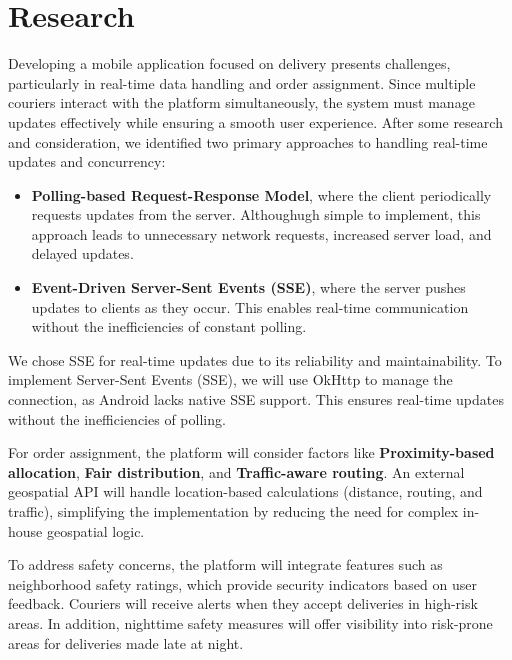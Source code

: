 \documentclass[a4paper,twoside,11pt]{article}
\begin{document}
\section*{Research}

Developing a mobile application focused on delivery presents challenges, particularly in real-time data handling and order assignment. Since multiple couriers interact with the platform simultaneously, the system must manage updates effectively while ensuring a smooth user experience. After some research and consideration, we identified two primary approaches to handling real-time updates and concurrency:

\begin{itemize}
    \item \textbf{Polling-based Request-Response Model}, where the client periodically requests updates from the server. Althoughugh simple to implement, this approach leads to unnecessary network requests, increased server load, and delayed updates.
    \item \textbf{Event-Driven Server-Sent Events (SSE)}, where the server pushes updates to clients as they occur. This enables real-time communication without the inefficiencies of constant polling.
\end{itemize}

We chose SSE for real-time updates due to its reliability and maintainability. To implement Server-Sent Events (SSE), we will use OkHttp to manage the connection, as Android lacks native SSE support. This ensures real-time updates without the inefficiencies of polling.

\vspace{2mm}

For order assignment, the platform will consider factors like \textbf{Proximity-based allocation}, \textbf{Fair distribution}, and \textbf{Traffic-aware routing}. An external geospatial API will handle location-based calculations (distance, routing, and traffic), simplifying the implementation by reducing the need for complex in-house geospatial logic.

\vspace{2mm}

To address safety concerns, the platform will integrate features such as neighborhood safety ratings, which provide security indicators based on user feedback. Couriers will receive alerts when they accept deliveries in high-risk areas. In addition, nighttime safety measures will offer visibility into risk-prone areas for deliveries made late at night.
\end{document}
